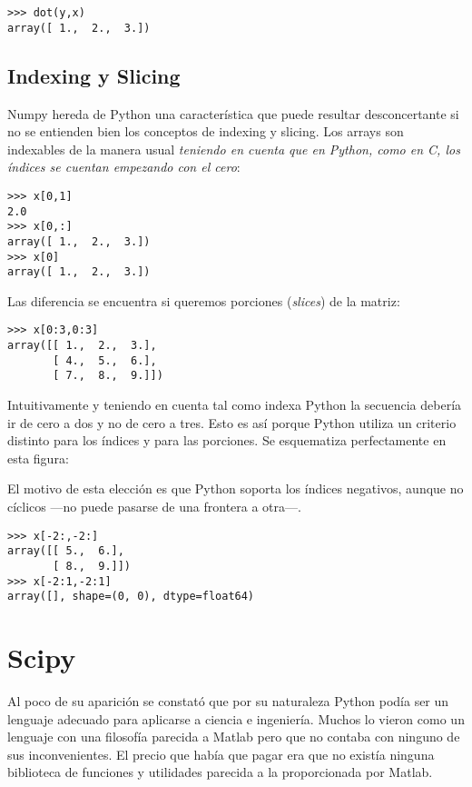 \documentclass[a4paper,10pt]{article}
\begin{document}
\begin{lstlisting}
>>> dot(y,x)
array([ 1.,  2.,  3.])
\end{lstlisting}

\subsection{Indexing y Slicing}

Numpy hereda de Python una característica que puede resultar
desconcertante si no se entienden bien los conceptos de indexing y
slicing. Los arrays son indexables de la manera usual \emph{teniendo
  en cuenta que en Python, como en C, los índices se cuentan empezando
  con el cero}:

\begin{lstlisting}
>>> x[0,1]
2.0
>>> x[0,:]
array([ 1.,  2.,  3.])
>>> x[0]
array([ 1.,  2.,  3.])
\end{lstlisting}

Las diferencia se encuentra si queremos porciones (\emph{slices}) de
la matriz:

\begin{lstlisting}
>>> x[0:3,0:3]
array([[ 1.,  2.,  3.],
       [ 4.,  5.,  6.],
       [ 7.,  8.,  9.]])
\end{lstlisting}

Intuitivamente y teniendo en cuenta tal como indexa Python la
secuencia debería ir de cero a dos y no de cero a tres.  Esto es así
porque Python utiliza un criterio distinto para los índices y para las
porciones.  Se esquematiza perfectamente en esta figura:



El motivo de esta elección es que Python soporta los índices
negativos, aunque no cíclicos ---no puede pasarse de una frontera a
otra---.

\begin{lstlisting}
>>> x[-2:,-2:]
array([[ 5.,  6.],
       [ 8.,  9.]])
>>> x[-2:1,-2:1]
array([], shape=(0, 0), dtype=float64)
\end{lstlisting}

\section{Scipy}

Al poco de su aparición se constató que por su naturaleza Python podía
ser un lenguaje adecuado para aplicarse a ciencia e ingeniería. Muchos
lo vieron como un lenguaje con una filosofía parecida a Matlab pero
que no contaba con ninguno de sus inconvenientes. El precio que había
que pagar era que no existía ninguna biblioteca de funciones y
utilidades parecida a la proporcionada por Matlab.
\end{document}
